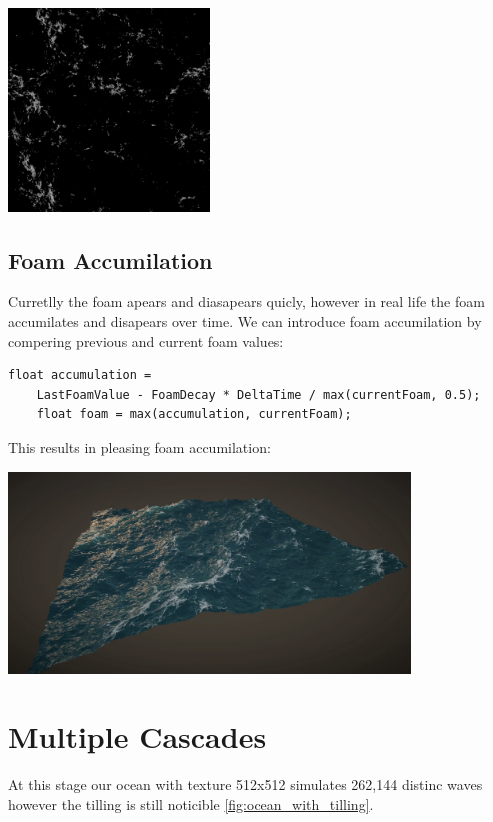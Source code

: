 \begin{minipage}{1\textwidth}
    \centering
    \includegraphics[width=0.40\textwidth]{"images/foam_texture.png"}
    \label{fig:foam_texture}
\end{minipage}

\subsection{Foam Accumilation}
Curretlly the foam apears and diasapears quicly, however in real life the foam accumilates and disapears over time.
We can introduce foam accumilation by compering previous and current foam values:
\begin{lstlisting}[caption={Foam Accumilation}, frame=single, numberstyle=\small\color{gray}, captionpos=b]
    float accumulation = 
    LastFoamValue - FoamDecay * DeltaTime / max(currentFoam, 0.5);
    float foam = max(accumulation, currentFoam);
\end{lstlisting}
This results in pleasing foam accumilation:
\begin{minipage}{1\textwidth}
    \centering
    \includegraphics[width=0.8\textwidth]{"images/ocean_with_foam.png"}
    \label{fig:ocean_with_foam}
\end{minipage}

\section{Multiple Cascades}
At this stage our ocean with texture 512x512 simulates 262,144 distinc waves however the tilling is still noticible \ref{fig:ocean_with_tilling}.

